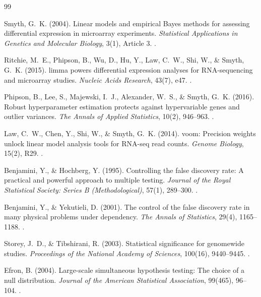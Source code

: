 \documentclass[11pt,twoside,openright]{book}
\begin{document}
\begin{thebibliography}{99}

Smyth, G.~K. (2004). Linear models and empirical Bayes methods for assessing differential expression in microarray experiments. \textit{Statistical Applications in Genetics and Molecular Biology}, 3(1), Article 3. .

Ritchie, M.~E., Phipson, B., Wu, D., Hu, Y., Law, C.~W., Shi, W., \& Smyth, G.~K. (2015). limma powers differential expression analyses for RNA-sequencing and microarray studies. \textit{Nucleic Acids Research}, 43(7), e47. .

Phipson, B., Lee, S., Majewski, I.~J., Alexander, W.~S., \& Smyth, G.~K. (2016). Robust hyperparameter estimation protects against hypervariable genes and outlier variances. \textit{The Annals of Applied Statistics}, 10(2), 946--963. .

Law, C.~W., Chen, Y., Shi, W., \& Smyth, G.~K. (2014). voom: Precision weights unlock linear model analysis tools for RNA-seq read counts. \textit{Genome Biology}, 15(2), R29. .

Benjamini, Y., \& Hochberg, Y. (1995). Controlling the false discovery rate: A practical and powerful approach to multiple testing. \textit{Journal of the Royal Statistical Society: Series B (Methodological)}, 57(1), 289--300. .

Benjamini, Y., \& Yekutieli, D. (2001). The control of the false discovery rate in many physical problems under dependency. \textit{The Annals of Statistics}, 29(4), 1165--1188. .

Storey, J.~D., \& Tibshirani, R. (2003). Statistical significance for genomewide studies. \textit{Proceedings of the National Academy of Sciences}, 100(16), 9440--9445. .

Efron, B. (2004). Large-scale simultaneous hypothesis testing: The choice of a null distribution. \textit{Journal of the American Statistical Association}, 99(465), 96--104. .


\end{thebibliography}
\end{document}
